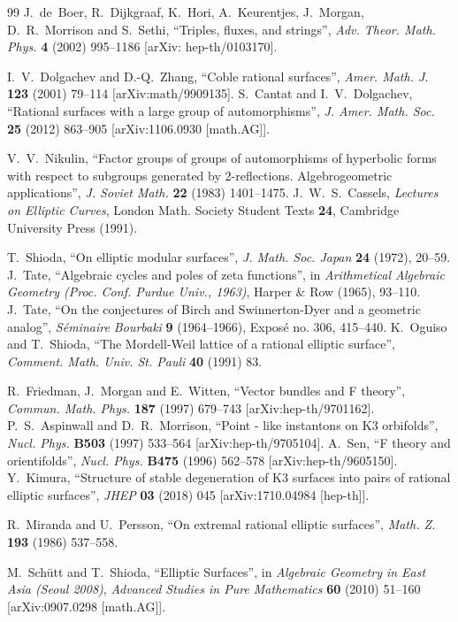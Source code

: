 \documentclass[12pt]{article}
\begin{document}
\begin{thebibliography}{99}
J.~de~Boer, R.~Dijkgraaf, K.~Hori, A.~Keurentjes, J.~Morgan, D.~R.~Morrison and S.~Sethi, ``Triples, fluxes, and strings'', {\it Adv. Theor. Math. Phys.} {\bf 4} (2002) 995--1186 [arXiv: hep-th/0103170].

I.~V.~Dolgachev and D.-Q.~Zhang, ``Coble rational surfaces'', {\it Amer. Math. J.} {\bf 123} (2001) 79--114 [arXiv:math/9909135]. 
S.~Cantat and I.~V.~Dolgachev, ``Rational surfaces with a large group of automorphisms'', {\it J. Amer. Math. Soc.} {\bf 25} (2012) 863--905 [arXiv:1106.0930 [math.AG]].

V.~V.~Nikulin, ``Factor groups of groups of automorphisms of hyperbolic forms with respect to subgroups generated by 2-reflections. Algebrogeometric applications'', {\it J. Soviet Math.} {\bf 22} (1983) 1401--1475.
J.~W.~S.~Cassels, {\it Lectures on Elliptic Curves}, London Math. Society Student Texts {\bf 24}, Cambridge University Press (1991).

T.~Shioda, ``On elliptic modular surfaces'', {\it J. Math. Soc. Japan} {\bf 24} (1972), 20--59.
J.~Tate, ``Algebraic cycles and poles of zeta functions'', in {\it Arithmetical Algebraic Geometry (Proc. Conf. Purdue Univ., 1963)}, Harper \& Row (1965), 93--110.
J.~Tate, ``On the conjectures of Birch and Swinnerton-Dyer and a geometric analog'', {\it S\'eminaire Bourbaki} {\bf 9} (1964--1966), Expos\'e no. 306, 415--440.
K.~Oguiso and T.~Shioda, ``The Mordell-Weil lattice of a rational elliptic surface'', {\it Comment. Math. Univ. St. Pauli} {\bf 40} (1991) 83.

R.~Friedman, J.~Morgan and E.~Witten, ``Vector bundles and F theory'', {\it Commun. Math. Phys.} {\bf 187} (1997) 679--743 [arXiv:hep-th/9701162].
P.~S.~Aspinwall and D.~R.~Morrison, ``Point - like instantons on K3 orbifolds'', {\it Nucl. Phys.} {\bf B503} (1997) 533--564 [arXiv:hep-th/9705104].
A.~Sen, ``F theory and orientifolds'', {\it Nucl. Phys.} {\bf B475} (1996) 562--578 [arXiv:hep-th/9605150].
Y.~Kimura, ``Structure of stable degeneration of K3 surfaces into pairs of rational elliptic surfaces'', {\it JHEP} {\bf 03} (2018) 045 [arXiv:1710.04984 [hep-th]].

R.~Miranda and U.~Persson, ``On extremal rational elliptic surfaces'', {\it Math. Z.} {\bf 193} (1986) 537--558.

M.~Sch\"{u}tt and T.~Shioda, ``Elliptic Surfaces'', in {\it Algebraic Geometry in East Asia (Seoul 2008)}, {\it Advanced Studies in Pure Mathematics} {\bf 60} (2010) 51--160 [arXiv:0907.0298 [math.AG]].

\end{thebibliography} 
\end{document}
